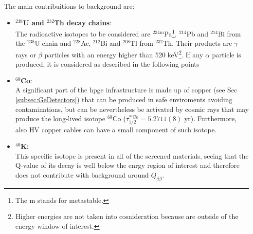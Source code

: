 The main contribuitions to background are:
\begin{itemize}
    \item \textbf{${}^{238}$U and ${}^{232}$Th decay chains}:\\
            The radioactive isotopes to be considered are ${}^{234\text{m}}$Pa\footnote{The m stands for metastable.}, ${}^{214}$Pb and ${}^{214}$Bi from the ${}^{238}$U chain and ${}^{228}$Ac, ${}^{212}$Bi and ${}^{208}$Tl from ${}^{232}$Th. Their products are $\gamma$ rays or $\beta$ particles with an energy higher than 520 keV\footnote{Higher energies are not taken into cosnideration because are outside of the energy window of interest.}. If any $\alpha$ particle is produced, it is considered as described in the following points
    \item \textbf{${}^{60}$Co}:\\
            A significant part of the \ac{hpge} infrastructure is made up of copper (see Sec \ref{subsec:GeDetectors}) that can be produced in safe enviroments avoiding contaminations, but can be nevertheless be activated by cosmic rays that may produce the long-lived isotope ${}^{60}$Co ($\tau_{1/2}^{{}^{60}\text{Co}} = 5.2711(8)$ yr). Furthermore, also \ac{HV} copper cables can have a small component of such isotope.

    \item \textbf{${}^{40}$K:}\\
            This specific isotope is present in all of the screened materials, seeing that the Q-value of its decay is well below the enrgy region of interest and therefore does not contribute with background around $Q_{\beta\beta}$.


\end{itemize}
